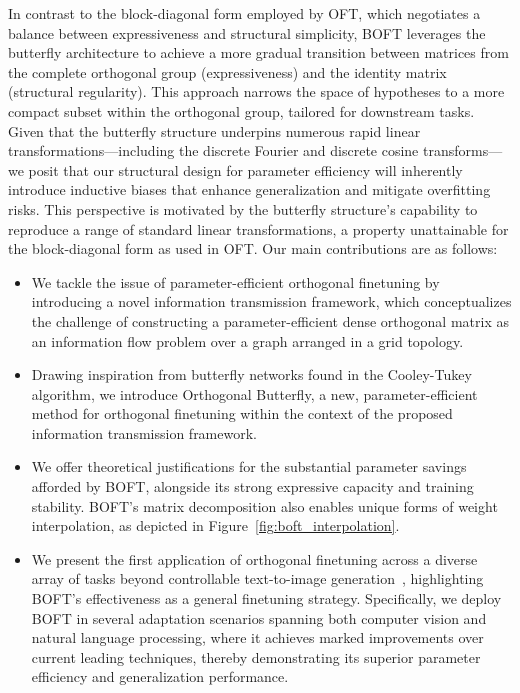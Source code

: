 In contrast to the block-diagonal form employed by OFT, which negotiates a balance between expressiveness and structural simplicity, BOFT leverages the butterfly architecture to achieve a more gradual transition between matrices from the complete orthogonal group (expressiveness) and the identity matrix (structural regularity). This approach narrows the space of hypotheses to a more compact subset within the orthogonal group, tailored for downstream tasks. Given that the butterfly structure underpins numerous rapid linear transformations—including the discrete Fourier and discrete cosine transforms—we posit that our structural design for parameter efficiency will inherently introduce inductive biases that enhance generalization and mitigate overfitting risks. This perspective is motivated by the butterfly structure’s capability to reproduce a range of standard linear transformations, a property unattainable for the block-diagonal form as used in OFT. Our main contributions are as follows:

\begin{itemize}[leftmargin=*,nosep]
    \item We tackle the issue of parameter-efficient orthogonal finetuning by introducing a novel information transmission framework, which conceptualizes the challenge of constructing a parameter-efficient dense orthogonal matrix as an information flow problem over a graph arranged in a grid topology.
    \item Drawing inspiration from butterfly networks found in the Cooley-Tukey algorithm, we introduce Orthogonal Butterfly, a new, parameter-efficient method for orthogonal finetuning within the context of the proposed information transmission framework.
    \item We offer theoretical justifications for the substantial parameter savings afforded by BOFT, alongside its strong expressive capacity and training stability. BOFT's matrix decomposition also enables unique forms of weight interpolation, as depicted in Figure~\ref{fig:boft_interpolation}.
    \item We present the first application of orthogonal finetuning across a diverse array of tasks beyond controllable text-to-image generation~\cite{qiu2023controlling}, highlighting BOFT's effectiveness as a general finetuning strategy. Specifically, we deploy BOFT in several adaptation scenarios spanning both computer vision and natural language processing, where it achieves marked improvements over current leading techniques, thereby demonstrating its superior parameter efficiency and generalization performance.
\end{itemize}

